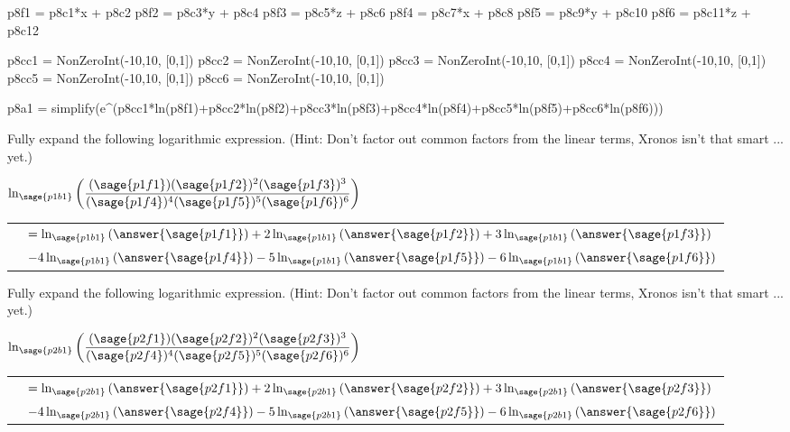 \documentclass{ximera}
\begin{document}
\begin{sagesilent}
p8f1 = p8c1*x + p8c2
p8f2 = p8c3*y + p8c4
p8f3 = p8c5*z + p8c6
p8f4 = p8c7*x + p8c8
p8f5 = p8c9*y + p8c10
p8f6 = p8c11*z + p8c12

p8cc1 = NonZeroInt(-10,10, [0,1])
p8cc2 = NonZeroInt(-10,10, [0,1])
p8cc3 = NonZeroInt(-10,10, [0,1])
p8cc4 = NonZeroInt(-10,10, [0,1])
p8cc5 = NonZeroInt(-10,10, [0,1])
p8cc6 = NonZeroInt(-10,10, [0,1])

p8a1 = simplify(e^(p8cc1*ln(p8f1)+p8cc2*ln(p8f2)+p8cc3*ln(p8f3)+p8cc4*ln(p8f4)+p8cc5*ln(p8f5)+p8cc6*ln(p8f6)))





\end{sagesilent}



\begin{problem}
    Fully expand the following logarithmic expression. (Hint: Don't factor out common factors from the linear terms, Xronos isn't that smart ... yet.)
    
    $
    \logOld_{\sage{p1b1}}\left(\dfrac{(\sage{p1f1})(\sage{p1f2})^2(\sage{p1f3})^3}{(\sage{p1f4})^4(\sage{p1f5})^5(\sage{p1f6})^6}\right)
    $
    
    \begin{tabular}{ll}
            \hspace{2cm} & $= \logOld_{\sage{p1b1}}\left(\answer{\sage{p1f1}}\right) + 2\logOld_{\sage{p1b1}}\left(\answer{\sage{p1f2}}\right) + 3\logOld_{\sage{p1b1}}\left(\answer{\sage{p1f3}}\right)$ \\ 
            & $-4\logOld_{\sage{p1b1}}\left(\answer{\sage{p1f4}}\right) - 5\logOld_{\sage{p1b1}}\left(\answer{\sage{p1f5}}\right) - 6\logOld_{\sage{p1b1}}\left(\answer{\sage{p1f6}}\right)$
    \end{tabular}
\end{problem}


\begin{problem}
    Fully expand the following logarithmic expression. (Hint: Don't factor out common factors from the linear terms, Xronos isn't that smart ... yet.)
    
    $
    \logOld_{\sage{p2b1}}\left(\dfrac{(\sage{p2f1})(\sage{p2f2})^2(\sage{p2f3})^3}{(\sage{p2f4})^4(\sage{p2f5})^5(\sage{p2f6})^6}\right)
    $
    
    \begin{tabular}{ll}
            \hspace{2cm} & $= \logOld_{\sage{p2b1}}\left(\answer{\sage{p2f1}}\right) + 2\logOld_{\sage{p2b1}}\left(\answer{\sage{p2f2}}\right) + 3\logOld_{\sage{p2b1}}\left(\answer{\sage{p2f3}}\right)$ \\ 
            & $-4\logOld_{\sage{p2b1}}\left(\answer{\sage{p2f4}}\right) - 5\logOld_{\sage{p2b1}}\left(\answer{\sage{p2f5}}\right) - 6\logOld_{\sage{p2b1}}\left(\answer{\sage{p2f6}}\right)$
    \end{tabular}
\end{problem}
\end{document}

